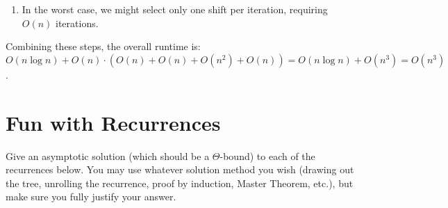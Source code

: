 \documentclass[11pt,fleqn]{exam}
\newenvironment{soln}{\color{solnblue}}{}
\newif\ifsolutions\solutionsfalse
\begin{document}
\begin{questions}
\begin{soln}
\begin{enumerate}
        \item In the worst case, we might select only one shift per iteration, requiring $O(n)$ iterations.
    \end{enumerate}
    
    Combining these steps, the overall runtime is:
    $O(n \log n) + O(n) \cdot (O(n) + O(n) + O(n^2) + O(n)) = O(n \log n) + O(n^3) = O(n^3)$.
\end{soln}

\ifsolutions\fi 

\end{questions}

\section{Fun with Recurrences}

Give an asymptotic solution (which should be a $\Theta$-bound) to each of the recurrences below. You may use whatever solution method you wish (drawing out the tree, unrolling the recurrence, proof by induction, Master Theorem, etc.), but make sure you fully justify your answer.
	
\end{document}
